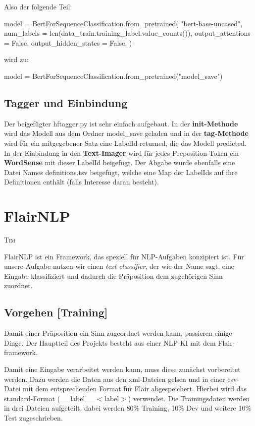 \documentclass[10pt,a4paper]{article}
\newcommand{\chapterauthor}[1]{%
	{\parindent0pt\vspace*{-5pt}\hspace*{\fill}%
  \linespread{1.1}\large\scshape#1%
  \par\nobreak\vspace*{10pt}}
}
\begin{document}
Also der folgende Teil:
\begin{python}
model = BertForSequenceClassification.from_pretrained(
    "bert-base-uncased", 
    num_labels = len(data_train.training_label.value_counts()), 
    output_attentions = False, 
    output_hidden_states = False, 
)
\end{python}
wird zu:
\begin{python}
model = BertForSequenceClassification.from_pretrained("model_save")
\end{python}


\subsection{Tagger und Einbindung}
Der beigefügter hftagger.py ist sehr einfach aufgebaut. In der \textbf{init-Methode} wird das Modell aus dem Ordner model\_save geladen und in der \textbf{tag-Methode} wird für ein mitgegebener Satz eine LabelId returned, die das Modell predicted. In der Einbindung in den \textbf{Text-Imager} wird für jedes Preposition-Token ein \textbf{WordSense} mit dieser LabelId beigefügt. Der Abgabe wurde ebenfalls eine Datei Names definitions.tsv beigefügt, welche eine Map der LabelIds auf ihre Definitionen enthält (falls Interesse daran besteht).

\section{FlairNLP}
\chapterauthor{Tim}
FlairNLP ist ein Framework, das speziell für NLP-Aufgaben konzipiert ist. Für unsere Aufgabe nutzen wir einen \textit{text classifier}, der wie der Name sagt, eine Eingabe klassifiziert und dadurch die Präposition dem zugehörigen Sinn zuordnet.

\subsection{Vorgehen [Training]}
Damit einer Präposition ein Sinn zugeordnet werden kann, passieren einige Dinge. Der Hauptteil des Projekts besteht aus einer NLP-KI mit dem Flair-framework.

Damit eine Eingabe verarbeitet werden kann, muss diese zunächst vorbereitet werden. Dazu werden die Daten aus den xml-Dateien gelsen und in einer csv-Datei mit dem entsprechenden Format für Flair abgespeichert. Hierbei wird das standard-Format (\_\_label\_\_$<$label$>$) verwendet. Die Trainingsdaten werden in drei Dateien aufgeteilt, dabei werden 80\% Training, 10\% Dev und weitere 10\% Test zugeschrieben.
\end{document}
